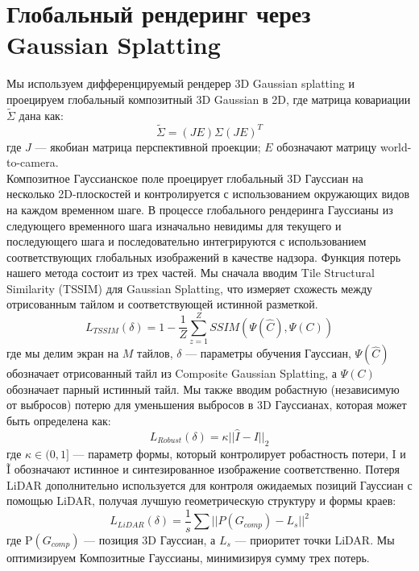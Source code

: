 \section{Глобальный рендеринг через Gaussian Splatting}
Мы используем дифференцируемый рендерер 3D Gaussian splatting и проецируем глобальный композитный 3D Gaussian в 2D, где матрица ковариации $\tilde\Sigma$  дана как:
$$\tilde{\Sigma} = (JE) \Sigma (JE)^T$$
где $J$ — якобиан матрица перспективной проекции; $E$ обозначают матрицу world-to-camera.\\
Композитное Гауссианское поле проецирует глобальный 3D Гауссиан на несколько 2D-плоскостей и контролируется с использованием окружающих видов на каждом временном шаге. В процессе глобального рендеринга Гауссианы из следующего временного шага изначально невидимы для текущего и последующего шага и последовательно интегрируются с использованием соответствующих глобальных изображений в качестве надзора.
Функция потерь нашего метода состоит из трех частей. Мы сначала вводим Tile Structural Similarity (TSSIM) для Gaussian Splatting, что измеряет схожесть между отрисованным тайлом и соответствующей истинной разметкой.
$$L_{TSSIM}(\delta) = 1 - \frac{1}{Z} \sum_{z=1}^{Z} SSIM(\Psi(\hat{C}), \Psi(C))$$
где мы делим экран на $M$ тайлов, $\delta$  — параметры обучения Гауссиан, $\Psi(\hat{C})$  обозначает отрисованный тайл из Composite Gaussian Splatting, а $\Psi(C)$ обозначает парный истинный тайл.
Мы также вводим робастную (независимую от выбросов) потерю для уменьшения выбросов в 3D Гауссианах, которая может быть определена как:
$$L_{Robust}(\delta) = \kappa ||\hat{I} - I||_2$$
где $\kappa \in (0, 1]$ — параметр формы, который контролирует робастность потери, I и Ĩ обозначают истинное и синтезированное изображение соответственно.
Потеря LiDAR дополнительно используется для контроля ожидаемых позиций Гауссиан с помощью LiDAR, получая лучшую геометрическую структуру и формы краев:
$$L_{LiDAR}(\delta) = \frac{1}{s} \sum ||P(G_{comp}) - L_s||^2$$где P$(G_{comp})$ — позиция 3D Гауссиан, а $L_s$ — приоритет точки LiDAR. Мы оптимизируем Композитные Гауссианы, минимизируя сумму трех потерь.